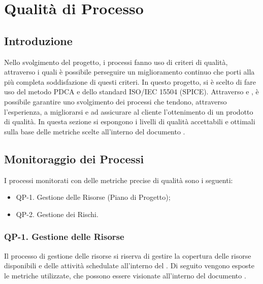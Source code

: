 \section{Qualità di Processo}

\subsection{Introduzione}

Nello svolgimento del progetto, i processi fanno uso di criteri di qualità, attraverso i quali è possibile perseguire un miglioramento continuo che porti alla più completa soddisfazione di questi criteri. In questo progetto, si è scelto di fare uso del metodo PDCA e dello standard ISO/IEC 15504 (SPICE). Attraverso  e , è possibile garantire uno svolgimento dei processi che tendono, attraverso l'esperienza, a migliorarsi e ad assicurare al cliente l'ottenimento di un prodotto di qualità.
In questa sezione si espongono i livelli di qualità accettabili e ottimali sulla base delle metriche scelte all'interno del documento .

\subsection{Monitoraggio dei Processi}

I processi monitorati con delle metriche precise di qualità sono i seguenti:

\begin{itemize}
	\item QP-1. Gestione delle Risorse (Piano di Progetto);
	\item QP-2. Gestione dei Rischi.
\end{itemize}

	\subsubsection{QP-1. Gestione delle Risorse}

		Il processo di gestione delle risorse si riserva di gestire la copertura delle risorse disponibili e delle attività schedulate all'interno del . Di seguito vengono esposte le metriche utilizzate, che possono essere visionate all'interno del documento .

